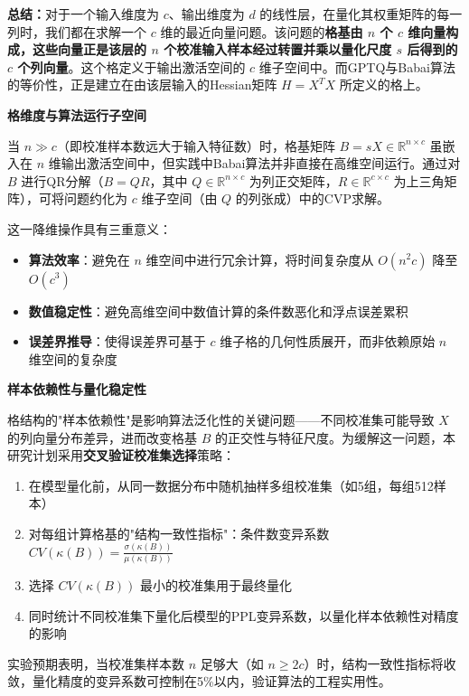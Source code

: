 \documentclass[letterpaper,twocolumn,10pt]{article}
\begin{document}
\textbf{总结：}对于一个输入维度为 $c$、输出维度为 $d$ 的线性层，在量化其权重矩阵的每一列时，我们都在求解一个 $c$ 维的最近向量问题。该问题的\textbf{格基由 $n$ 个 $c$ 维向量构成，这些向量正是该层的 $n$ 个校准输入样本经过转置并乘以量化尺度 $s$ 后得到的 $c$ 个列向量}。这个格定义于输出激活空间的 $c$ 维子空间中。而GPTQ与Babai算法的等价性，正是建立在由该层输入的Hessian矩阵 $H = X^T X$ 所定义的格上。

\textbf{格维度与算法运行子空间}

当 $n \gg c$（即校准样本数远大于输入特征数）时，格基矩阵 $B = sX \in \mathbb{R}^{n \times c}$ 虽嵌入在 $n$ 维输出激活空间中，但实践中Babai算法并非直接在高维空间运行。通过对 $B$ 进行QR分解（$B = QR$，其中 $Q \in \mathbb{R}^{n \times c}$ 为列正交矩阵，$R \in \mathbb{R}^{c \times c}$ 为上三角矩阵），可将问题约化为 $c$ 维子空间（由 $Q$ 的列张成）中的CVP求解。

这一降维操作具有三重意义：
\begin{itemize}
\item \textbf{算法效率}：避免在 $n$ 维空间中进行冗余计算，将时间复杂度从 $O(n^2c)$ 降至 $O(c^3)$
\item \textbf{数值稳定性}：避免高维空间中数值计算的条件数恶化和浮点误差累积
\item \textbf{误差界推导}：使得误差界可基于 $c$ 维子格的几何性质展开，而非依赖原始 $n$ 维空间的复杂度
\end{itemize}

\textbf{样本依赖性与量化稳定性}

格结构的"样本依赖性"是影响算法泛化性的关键问题——不同校准集可能导致 $X$ 的列向量分布差异，进而改变格基 $B$ 的正交性与特征尺度。为缓解这一问题，本研究计划采用\textbf{交叉验证校准集选择}策略：

\begin{enumerate}
\item 在模型量化前，从同一数据分布中随机抽样多组校准集（如5组，每组512样本）
\item 对每组计算格基的"结构一致性指标"：条件数变异系数 $CV(\kappa(B)) = \frac{\sigma(\kappa(B))}{\mu(\kappa(B))}$
\item 选择 $CV(\kappa(B))$ 最小的校准集用于最终量化
\item 同时统计不同校准集下量化后模型的PPL变异系数，以量化样本依赖性对精度的影响
\end{enumerate}

实验预期表明，当校准集样本数 $n$ 足够大（如 $n \geq 2c$）时，结构一致性指标将收敛，量化精度的变异系数可控制在5\%以内，验证算法的工程实用性。
\end{document}
